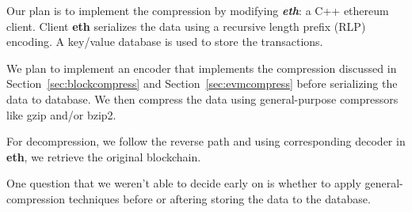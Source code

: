 Our plan is to implement the compression by modifying \textbf{\emph{eth}}:
 a C++ ethereum client. 
Client \textbf{eth} serializes the data using a recursive length prefix (RLP) encoding.
A key/value database is used to store the transactions.

We plan to implement an encoder  that implements the compression  
discussed in Section~\ref{sec:blockcompress} and Section~\ref{sec:evmcompress} 
before serializing the data to database.
We then compress the data using general-purpose compressors like gzip and/or bzip2.

For decompression, we follow the reverse path and using
corresponding decoder in \textbf{eth}, we  retrieve the original blockchain.

One question that we weren't able to decide early on is whether to apply general-compression techniques before or aftering storing the data to the database.
